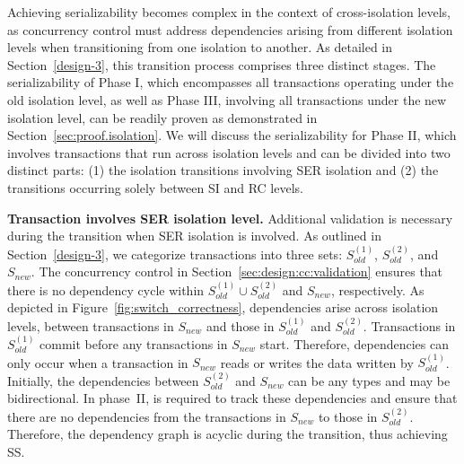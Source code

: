 Achieving serializability becomes complex in the context of cross-isolation levels, as concurrency control must address dependencies arising from different isolation levels when transitioning from one isolation to another. 
As detailed in Section~\ref{design-3}, this transition process comprises three distinct stages. 
The serializability of Phase I, which encompasses all transactions operating under the old isolation level, as well as Phase III, involving all transactions under the new isolation level, can be readily proven as demonstrated in Section~\ref{sec:proof.isolation}.
We will discuss the serializability for Phase II, which involves transactions that run across isolation levels and can be divided into two distinct parts: (1) the isolation transitions involving SER isolation and (2) the transitions occurring solely between SI and RC levels. 

\textbf{Transaction involves SER isolation level.} Additional validation is necessary during the transition when SER isolation is involved. As outlined in Section~\ref{design-3}, we categorize transactions into three sets: $S_{old}^{(1)}$, $S_{old}^{(2)}$, and $S_{new}$. The concurrency control in Section~\ref{sec:design:cc:validation} ensures that there is no dependency cycle within $S_{old}^{(1)} \cup S_{old}^{(2)}$ and $S_{new}$, respectively.
As depicted in Figure~\ref{fig:switch_correctness}, dependencies arise across isolation levels, between transactions in $S_{new}$ and those in $S_{old}^{(1)}$ and $S_{old}^{(2)}$. 
 Transactions in $S_{old}^{(1)}$ commit before any transactions in $S_{new}$ start. Therefore, dependencies can only occur when a transaction in $S_{new}$ reads or writes the data written by $S_{old}^{(1)}$. 
 Initially, the dependencies between $S_{old}^{(2)}$ and $S_{new}$ can be any types and may be bidirectional. 
In phase~II, \sysname is required to track these dependencies and ensure that there are no dependencies from the transactions in $S_{new}$ to those in $S_{old}^{(2)}$. 
Therefore, the dependency graph is acyclic during the transition, thus achieving SS.

